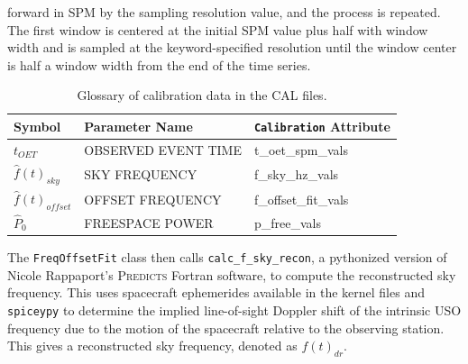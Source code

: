 \documentclass[titlepage, 12pt]{article}
\begin{document}
                forward in SPM by the sampling resolution value, and the process
                is repeated. The first window is centered at the initial SPM value
                plus half with window width and is sampled at the
                keyword-specified resolution until the window center is half a
                window width from the end of the time series.
                \par\hfill\par
                \begin{table}[H]
                    \centering
                    \begin{tabular}{l l l}
                        \hline
                        Symbol&Parameter Name
                              &\texttt{Calibration} Attribute\\
                        \hline
                        $t_{OET}$&OBSERVED EVENT TIME
                                 &t\_oet\_spm\_vals\\
                        $\hat{f}(t)_{sky}$&SKY FREQUENCY
                                 &f\_sky\_hz\_vals\\
                        $\hat{f}(t)_{offset}$&OFFSET FREQUENCY
                                   &f\_offset\_fit\_vals\\
                        $\hat{P}_{0}$&FREESPACE POWER
                                  &p\_free\_vals \\
                        \hline
                    \end{tabular}
                    \caption[Glossary of data from the CAL file]
                        {Glossary of calibration data in the CAL files.}
                    \label{tab:easydata_glossary_from_cal_file}
                \end{table}
                \par\hfill\par
                The \texttt{FreqOffsetFit} class then calls
                \texttt{calc\_f\_sky\_recon}, a pythonized version of Nicole Rappaport's \textsc{Predicts} Fortran software, to compute the reconstructed sky
                frequency. This uses spacecraft ephemerides available in the
                kernel files and \texttt{spiceypy} to determine the implied line-of-sight Doppler
                shift of the intrinsic USO frequency due to the motion of the 
                spacecraft relative to the observing station. This gives a
                reconstructed sky frequency, denoted as $f(t)_{dr}$.
                \par\hfill\par
\end{document}
